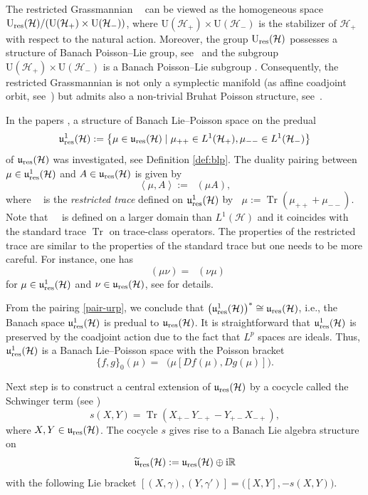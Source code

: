 \documentclass[pdftex]{sigma}
\theoremstyle{definition}
\numberwithin{equation}{section}
\newcommand{\pair}[2]{\left\langle #1 , #2 \right\rangle}
\newcommand{\R}{\mathbb R}
\renewcommand{\H}{\mathcal{H}}
\DeclareMathOperator{\Gr}{Gr_{res}(\H,\H_+)}
\newcommand{\Up}{\mathrm{U}(\H_+)}\newcommand{\Um}{\mathrm{U}(\H_-)}
\newcommand{\Ur}{\mathrm{U}_{\textnormal{res}}(\H)}
\newcommand{\ur}{\mathfrak u_{\textnormal{res}}(\H)}
\newcommand{\urp}{\mathfrak u_{\textnormal{res}}^1(\H)}
\newcommand{\urt}{\widetilde{\mathfrak u}_{\textnormal{res}}(\H)}
\DeclareMathOperator{\Tr}{Tr}
\DeclareMathOperator{\Trr}{Tr_{res}}
\newcommand{\Lj}{L^1(\H)}
\newcommand{\Ljm}{L^1(\H_-)}\newcommand{\Ljp}{L^1(\H_+)}
\newcommand{\be}{\begin{equation}}
\newcommand{\ee}{\end{equation}}
\begin{document}
The restricted Grassmannian $\Gr$ can be viewed as the homogeneous space $\Ur/\allowbreak(\Up\times\Um)$, where $\Up\times\Um$ is the stabilizer of $\H_+$ with respect to the natural action.
Moreover, the group $\Ur$ possesses a structure of Banach Poisson--Lie group, see~\cite[Theorem 7.12]{tumpach-bruhat} and the subgroup $\Up\times\Um$ is a Banach Poisson--Lie
subgroup \cite[Proposition 8.2]{tumpach-bruhat}. Consequently, the restricted Grassmannian is not only a symplectic manifold (as affine coadjoint orbit, see~\cite{Ratiu-grass}) but admits also a non-trivial Bruhat Poisson structure, see~\cite[Theorem 8.3]{tumpach-bruhat}.

In the papers \cite{Ratiu-grass,Oext}, a structure of Banach Lie--Poisson space on the predual
\[
 \urp:=\bigl\{ \mu\in \ur \mid \mu_{++}\in \Ljp , \mu_{--}\in \Ljm\bigr\}
 \]
of $\ur$ was investigated, see Definition \ref{def:blp}.
The duality pairing between $\mu\in\urp$ and $A\in\ur$ is given by
\be \label{pair-urp}\pair\mu A:=\Trr(\mu A),\ee
where $\Trr$ is the \emph{restricted trace} defined on $\urp$ by
$\Trr \mu :=\Tr(\mu_{++}+\mu_{--})$.
Note that~$\Trr$ is defined on a larger domain than $\Lj$ and it coincides with the standard trace $\Tr$ on trace-class operators.
The properties of the restricted trace are similar to the properties of the standard trace but one needs to be more careful. For instance, one has
\be \label{trr-cyclic}\Trr(\mu\nu)=\Trr(\nu\mu)\ee
for $\mu\in\urp$ and $\nu\in\ur$,
see \cite{GO-grass} for details.

From the pairing \eqref{pair-urp}, we conclude that $\bigl(\urp\bigr)^*\cong \ur$, i.e., the Banach space
$\urp$ is predual to $\ur$.
It is straightforward that $\urp$ is preserved by the coadjoint action due to the fact that $L^p$ spaces are ideals. Thus, $\urp$ is a Banach Lie--Poisson space with the Poisson bracket
\be \label{pb-0}\{f,g\}_0(\mu) =
\Trr\bigl(\mu [Df(\mu),Dg(\mu)]\bigr).\ee

Next step is to construct a central extension of $\ur$ by a cocycle called the Schwinger term (see \cite{Ratiu-grass, GO-grass, mickelsson,schwinger, wurzbacher})
\be \label{schwinger}s(X,Y)=\Tr(X_{+-}Y_{-+}-Y_{+-}X_{-+}),\ee
where $X, Y \in \ur$.
The cocycle $s$ gives rise to a Banach Lie algebra structure on
\[\urt:=\ur\oplus {\rm i}\R\]
with the following Lie bracket
$ [(X,\gamma),(Y,\gamma')]=\bigl([X,Y],-s(X,Y)\bigr)$.
\end{document}
